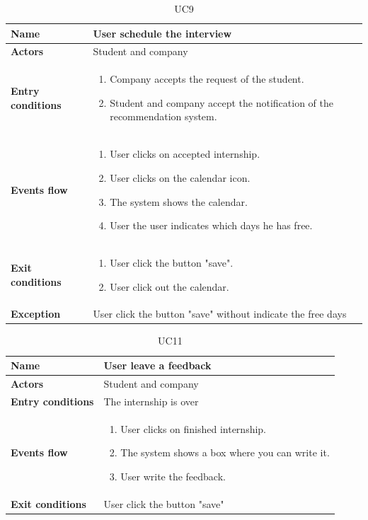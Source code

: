 \begin{table}[H]
\renewcommand\arraystretch{1.25}
    \centering
    \begin{tabular}{|l|p{12 cm}|}
    \hline
    \textbf{Name} & User schedule the interview\\
    \hline
    \textbf{Actors} & Student and company\\
    \hline
    \textbf{Entry conditions} & 
    \begin{enumerate}[label=(\alph*)]
        \item Company accepts the request of the student.
        \item Student and company accept the notification of the recommendation system.
    \end{enumerate}\\
    \hline
    \textbf{Events flow} &
    \begin{enumerate}
        \item User clicks on accepted internship.
        \item User clicks on the calendar icon.
        \item The system shows the calendar.
        \item User the user indicates which days he has free.
    \end{enumerate}\\  
    \hline
    \textbf{Exit conditions} & 
    \begin{enumerate}[label=(\alph*)]
        \item User click the button "save".
        \item User click out the calendar.
    \end{enumerate}\\
    \hline
    \textbf{Exception} & User click the button "save" without indicate the free days\\
    \hline
    \end{tabular}
    \caption{UC9}
    \label{UC9}
\end{table}

\begin{table}[H]
\renewcommand\arraystretch{1.25}
    \centering
    \begin{tabular}{|l|p{12 cm}|}
    \hline
    \textbf{Name} & User leave a feedback\\
    \hline
    \textbf{Actors} & Student and company\\
    \hline
    \textbf{Entry conditions} & The internship is over\\
    \hline
    \textbf{Events flow} &
    \begin{enumerate}
        \item User clicks on  finished internship.
        \item The system shows a box where you can write it.
        \item User write the feedback.
    \end{enumerate}\\  
    \hline
    \textbf{Exit conditions} & User click the button "save"\\
    \hline
    \end{tabular}
    \caption{UC11}
    \label{UC11}
\end{table}

